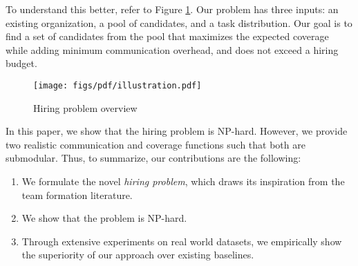 To understand this better, refer to Figure \ref{fig:hpo}.
Our problem has three inputs: an existing organization, a pool of candidates, and a task distribution. 
Our goal is to find a set of candidates from the pool that maximizes the expected coverage while adding minimum communication overhead, and does not exceed a hiring budget. 
\begin{figure}
\centering
\begin{small}
\texttt{[image: figs/pdf/illustration.pdf]}
\caption{Hiring problem overview}
\label{fig:hpo}
\end{small}
\end{figure} 

In this paper, we show that the hiring problem is NP-hard.
However, we provide two realistic communication and coverage functions such that both are submodular.
Thus, to summarize, our contributions are the following:

\begin{enumerate}
\item We formulate the novel \textit{hiring problem}, which draws its inspiration from the team formation literature.

\item We show that the problem is NP-hard. 


\item Through extensive experiments on real world datasets, we empirically show the superiority of our approach over existing baselines. 

\end{enumerate}